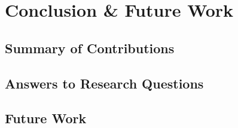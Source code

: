 \chapter{Conclusion \& Future Work}
\label{ch:conclusion}


\section{Summary of Contributions}

\section{Answers to Research Questions}

\section{Future Work}